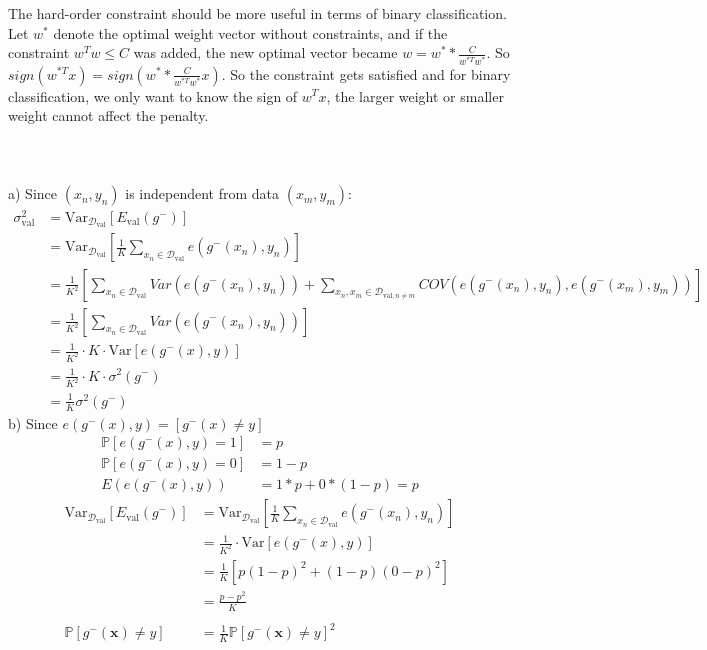 \documentclass[12pt]{article}
\begin{document}
 \\\\
\indent The hard-order constraint should be more useful in terms of binary classification. Let $w^*$ denote the optimal weight vector without constraints, and if the constraint $w^Tw \leq C$ was added, the new optimal vector became $\displaystyle w = w^**\frac{C}{w^{*T}w^*}$. So $sign(w^{*T}x) = sign(w^**\frac{C}{w^{*T}w^*}x)$. So the constraint gets satisfied and for binary classification, we only want to know the sign of $  {w}^T  {x}$, the larger weight or smaller weight cannot affect the penalty.\\\\

 \\\\
\indent a) Since $(x_n,y_n)$ is independent from data $(x_m,y_m)$:
\begin{align*}
	\sigma_{\mathrm{val}}^2 &= \mathrm{Var}_{\mathcal{D}_\mathrm{val}}\left[E_{\mathrm{val}}(g^-)\right] \\
	&= \mathrm{Var}_{\mathcal{D}_\mathrm{val}}\left[\frac{1}{K}\sum_{  {x}_n\in\mathcal{D}_{\mathrm{val}}}  {e}(g^-(  {x}_n), y_n)\right] \\
	&= \frac{1}{K^2}\left[\sum_{  {x}_n\in\mathcal{D}_{\mathrm{val}}} Var({e}(g^-(  {x}_n), y_n)) + \sum_{  {x}_n,x_m \in\mathcal{D}_{\mathrm{val},n\neq m}} COV( {e}(g^-(  {x}_n), y_n),  {e}(g^-(  {x}_m), y_m))\right] \\
	&= \frac{1}{K^2}\left[\sum_{  {x}_n\in\mathcal{D}_{\mathrm{val}}} Var({e}(g^-(  {x}_n), y_n)) \right] \\
	&= \frac{1}{K^2} \cdot  K \cdot \mathrm{Var}\left[  {e}(g^-(  {x}), y)\right] \\
	&= \frac{1}{K^2} \cdot  K \cdot  \sigma^2(g^-) \\
	&= \frac{1}{K}\sigma^2(g^-) 
\end{align*}
\indent b) Since $e(g^-(x),y) = \left[ g^-(x) \neq y \right]$
\begin{align*}
		\mathbb{P}\left[e(g^-(x),y)=1\right] &= p\\ 
		\mathbb{P}\left[e(g^-(x),y)=0\right] &= 1-p\\
		E(e(g^-(x),y)) &= 1*p + 0*(1-p) = p
\end{align*}
\begin{align*}
\mathrm{Var}_{\mathcal{D}_\mathrm{val}}\left[E_{\mathrm{val}}(g^-)\right] &= \mathrm{Var}_{\mathcal{D}_\mathrm{val}}\left[\frac{1}{K}\sum_{  {x}_n\in\mathcal{D}_{\mathrm{val}}}  {e}(g^-(  {x}_n), y_n)\right] \\
&= \frac{1}{K^2} \cdot \mathrm{Var}\left[  {e}(g^-(  {x}), y)\right] \\
&= \frac{1}{K} \left[ p(1-p)^2+(1-p)(0-p)^2 \right]\\
& = \frac{p - p^2}{K}\\\\
\mathbb{P}\left[g^-(\textbf{x})\neq y\right]  &= \frac{1}{K}\mathbb{P}\left[g^-(\textbf{x})\neq y\right]^2
\end{align*}
\end{document}
